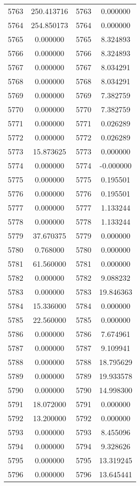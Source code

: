 \documentclass[12pt]{article}
\begin{document}
\begin{longtable}{@{}cccc@{}}
5763 & 250.413716 & 5763 & 0.000000 \\
5764 & 254.850173 & 5764 & 0.000000 \\
5765 & 0.000000 & 5765 & 8.324893 \\
5766 & 0.000000 & 5766 & 8.324893 \\
5767 & 0.000000 & 5767 & 8.034291 \\
5768 & 0.000000 & 5768 & 8.034291 \\
5769 & 0.000000 & 5769 & 7.382759 \\
5770 & 0.000000 & 5770 & 7.382759 \\
5771 & 0.000000 & 5771 & 0.026289 \\
5772 & 0.000000 & 5772 & 0.026289 \\
5773 & 15.873625 & 5773 & 0.000000 \\
5774 & 0.000000 & 5774 & -0.000000 \\
5775 & 0.000000 & 5775 & 0.195501 \\
5776 & 0.000000 & 5776 & 0.195501 \\
5777 & 0.000000 & 5777 & 1.133244 \\
5778 & 0.000000 & 5778 & 1.133244 \\
5779 & 37.670375 & 5779 & 0.000000 \\
5780 & 0.768000 & 5780 & 0.000000 \\
5781 & 61.560000 & 5781 & 0.000000 \\
5782 & 0.000000 & 5782 & 9.088232 \\
5783 & 0.000000 & 5783 & 19.846363 \\
5784 & 15.336000 & 5784 & 0.000000 \\
5785 & 22.560000 & 5785 & 0.000000 \\
5786 & 0.000000 & 5786 & 7.674961 \\
5787 & 0.000000 & 5787 & 9.109941 \\
5788 & 0.000000 & 5788 & 18.795629 \\
5789 & 0.000000 & 5789 & 19.933578 \\
5790 & 0.000000 & 5790 & 14.998300 \\
5791 & 18.072000 & 5791 & 0.000000 \\
5792 & 13.200000 & 5792 & 0.000000 \\
5793 & 0.000000 & 5793 & 8.455096 \\
5794 & 0.000000 & 5794 & 9.328626 \\
5795 & 0.000000 & 5795 & 13.319245 \\
5796 & 0.000000 & 5796 & 13.645441 \\

\end{longtable}
\end{document}
